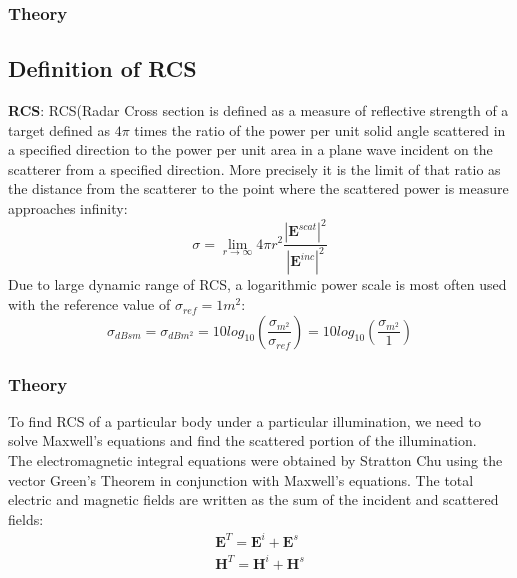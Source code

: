 \documentclass{beamer}
\begin{document}
\begin{frame}
\frametitle{Theory}
\subsection{Definition of RCS}
\textbf{RCS}: RCS(Radar Cross section is defined as a measure of reflective strength of a target defined as $4\pi$ times the ratio of the power per unit solid angle scattered  in a specified direction to the power per unit area in a plane wave incident on the scatterer from a specified direction. More precisely it is the limit of that ratio as the distance from the scatterer to the point where the scattered power is measure approaches infinity:
\begin{equation}
\sigma = \lim_{r\to\infty} 4\pi r^2 \frac{|\textbf{E}^{scat}|^2}{|\textbf{E}^{inc}|^2}
\end{equation}
Due to large dynamic range of RCS, a logarithmic power scale is most often used with the reference value of $\sigma_{ref} = 1 m^2$:
\begin{equation}
\sigma_{dBsm} = \sigma_{dBm^2} = 10log_{10}(\frac{\sigma_{m^2}}{\sigma_{ref}}) = 10log_{10}(\frac{\sigma_{m^2}}{1})
\end{equation}
\end{frame}
\begin{frame}
\frametitle{Theory}
To find RCS of a particular body under a particular illumination, we need to solve Maxwell's equations and find the scattered portion of the illumination.\\
The electromagnetic integral equations were obtained by Stratton Chu using the vector Green's Theorem in conjunction with Maxwell's equations. The total electric and magnetic fields are written as the sum of the incident and scattered fields:
\begin{eqnarray}
\textbf{E}^T = \textbf{E}^i + \textbf{E}^s \\
\textbf{H}^T = \textbf{H}^i + \textbf{H}^s
\end{eqnarray}
\end{frame}
\end{document}
